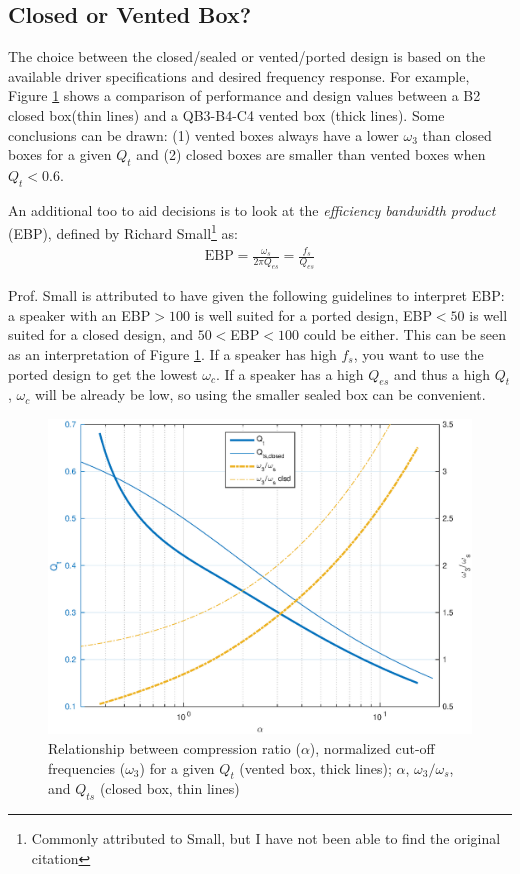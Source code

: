 \documentclass[10pt]{book}
\begin{document}
\subsection{Closed or Vented Box?}
The choice between the closed/sealed or vented/ported design is based on the available driver specifications and desired frequency response. For example, Figure \ref{fig:sealed_vs_ported_design} shows a comparison of performance and design values between a B2 closed box(thin lines) and a QB3-B4-C4 vented box (thick lines). Some conclusions can be drawn: (1) vented boxes always have a lower $\omega_3$ than closed boxes for a given $Q_t$ and (2) closed boxes are smaller than vented boxes when $Q_t<0.6$.



An additional too to aid decisions is to look at the \textit{efficiency bandwidth product} (EBP), defined by Richard Small\footnote{Commonly attributed to Small, but I have not been able to find the original citation} as:
\begin{align}
\mbox{EBP}=\frac{\omega_s}{2\pi Q_{es}}=\frac{f_s}{Q_{es}}
\end{align}

Prof. Small is attributed to have given the following guidelines to interpret EBP: a speaker with an EBP$>100$ is well suited for a ported design, EBP$<50$ is well suited for a closed design, and $50<$EBP$<100$ could be either. This can be seen as an interpretation of Figure \ref{fig:sealed_vs_ported_design}. If a speaker has high $f_s$, you want to use the ported design to get the lowest $\omega_c$. If a speaker has a high $Q_{es}$ and thus a high $Q_t$, $\omega_c$ will be already be low, so using the smaller sealed box can be convenient.



\begin{figure}
\centering
\includegraphics[width=.75\textwidth]{matlab/sealed_vs_ported_design.eps}
\caption{Relationship between compression ratio ($\alpha$), normalized cut-off frequencies ($\omega_3$) for a given $Q_t$ (vented box, thick lines); $\alpha$, $\omega_3/\omega_s$, and $Q_{ts}$ (closed box, thin lines)}\label{fig:sealed_vs_ported_design}
\end{figure}
\end{document}

